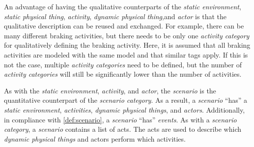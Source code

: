 
An advantage of having the qualitative counterparts of the \textit{static environment}, \cstartb \textit{static physical thing}\cendb, \textit{activity}, \cstartb \textit{dynamic physical thing},\cendb and \textit{actor} is that the qualitative description can be reused and exchanged. For example, there can be many different braking activities, but there needs to be only one \textit{activity category} for qualitatively defining the braking activity. Here, it is assumed that all braking activities are modeled with the same model and that similar tags apply. If this is not the case, multiple \textit{activity categories} need to be defined, but the number of \textit{activity categories} will still be significantly lower than the number of activities.

As with the \textit{static environment}, \textit{activity}, and \textit{actor}, the \textit{scenario} is the quantitative counterpart of the \textit{scenario category}. As a result, a \textit{scenario} ``has'' a \textit{static environment}, \textit{activities}, \cstartb \textit{dynamic physical things}, \cendb and \textit{actors}. 
Additionally, in compliance with \cref{def:scenario}, a \textit{scenario} ``has'' \textit{events}. 
As with a \textit{scenario category}, a \textit{scenario} contains a list of acts.
The acts are used to describe which \cstartb \textit{dynamic physical things} and \cendb actors perform which activities.
